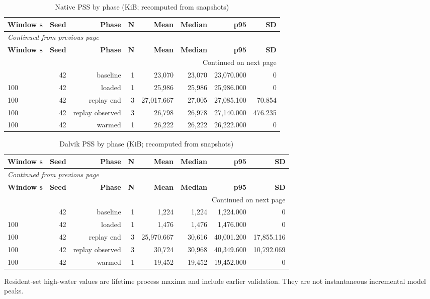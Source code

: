 \documentclass[10pt,a4paper]{article}
\begin{document}
\begingroup\small\setlength{\tabcolsep}{4pt}\renewcommand{\arraystretch}{1.12}
\begin{longtable}{@{}lrrrrrrr@{}}
\caption{Native PSS by phase (KiB; recomputed from snapshots)}\\
\toprule
\textbf{Window s} & \textbf{Seed} & \textbf{Phase} & \textbf{N} & \textbf{Mean} & \textbf{Median} & \textbf{p95} & \textbf{SD} \\
\midrule\endfirsthead
\multicolumn{8}{l}{\small\itshape Continued from previous page}\\
\toprule
\textbf{Window s} & \textbf{Seed} & \textbf{Phase} & \textbf{N} & \textbf{Mean} & \textbf{Median} & \textbf{p95} & \textbf{SD} \\
\midrule\endhead
\midrule\multicolumn{8}{r}{\small Continued on next page}\\\endfoot
\bottomrule\endlastfoot
100 & 42 & baseline & 1 & 23,070 & 23,070 & 23,070.000 & 0 \\
100 & 42 & loaded & 1 & 25,986 & 25,986 & 25,986.000 & 0 \\
100 & 42 & replay end & 3 & 27,017.667 & 27,005 & 27,085.100 & 70.854 \\
100 & 42 & replay observed & 3 & 26,798 & 26,978 & 27,140.000 & 476.235 \\
100 & 42 & warmed & 1 & 26,222 & 26,222 & 26,222.000 & 0 \\
\end{longtable}\endgroup
\begingroup\small\setlength{\tabcolsep}{4pt}\renewcommand{\arraystretch}{1.12}
\begin{longtable}{@{}lrrrrrrr@{}}
\caption{Dalvik PSS by phase (KiB; recomputed from snapshots)}\\
\toprule
\textbf{Window s} & \textbf{Seed} & \textbf{Phase} & \textbf{N} & \textbf{Mean} & \textbf{Median} & \textbf{p95} & \textbf{SD} \\
\midrule\endfirsthead
\multicolumn{8}{l}{\small\itshape Continued from previous page}\\
\toprule
\textbf{Window s} & \textbf{Seed} & \textbf{Phase} & \textbf{N} & \textbf{Mean} & \textbf{Median} & \textbf{p95} & \textbf{SD} \\
\midrule\endhead
\midrule\multicolumn{8}{r}{\small Continued on next page}\\\endfoot
\bottomrule\endlastfoot
100 & 42 & baseline & 1 & 1,224 & 1,224 & 1,224.000 & 0 \\
100 & 42 & loaded & 1 & 1,476 & 1,476 & 1,476.000 & 0 \\
100 & 42 & replay end & 3 & 25,970.667 & 30,616 & 40,001.200 & 17,855.116 \\
100 & 42 & replay observed & 3 & 30,724 & 30,968 & 40,349.600 & 10,792.069 \\
100 & 42 & warmed & 1 & 19,452 & 19,452 & 19,452.000 & 0 \\
\end{longtable}\endgroup
Resident-set high-water values are lifetime process maxima and include earlier validation. They are not instantaneous incremental model peaks.
\end{document}
